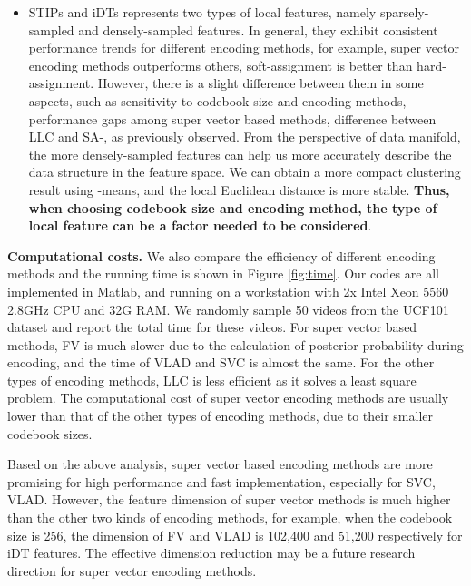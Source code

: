 \documentclass[twocolumn]{svjour3}          \smartqed  \usepackage{slashbox}
\begin{document}
\begin{itemize}
  \item STIPs and iDTs represents two types of local features, namely sparsely-sampled and densely-sampled features. In general, they exhibit consistent performance trends for different encoding methods, for example, super vector encoding methods outperforms others, soft-assignment is better than hard-assignment. However, there is a slight difference between them in some aspects, such as sensitivity to codebook size and encoding methods, performance gaps among super vector based methods, difference between LLC and SA-, as previously observed. From the perspective of data manifold, the more densely-sampled features can help us more accurately describe the data structure in the feature space. We can obtain a more compact clustering result using -means, and the local Euclidean distance is more stable. \textbf{Thus, when choosing codebook size and encoding method, the type of local feature can be a factor needed to be considered}.
\end{itemize}

\textbf{Computational costs.} We also compare the efficiency of different encoding methods and the running time is shown in Figure \ref{fig:time}. Our codes are all implemented in Matlab, and running on a workstation with 2x Intel Xeon 5560 2.8GHz CPU and 32G RAM. We randomly sample 50 videos from the UCF101 dataset and report the total time for these videos. For super vector based methods, FV is much slower due to the calculation of posterior probability during encoding, and the time of VLAD and SVC is almost the same. For the other types of encoding methods, LLC is less efficient as it solves a least square problem. The computational cost of super vector encoding methods are usually lower than that of the other types of encoding methods, due to their smaller codebook sizes.

Based on the above analysis, super vector based encoding methods are more promising for high performance and fast implementation, especially for SVC, VLAD. However, the feature dimension of super vector methods is much higher than the other two kinds of encoding methods, for example, when the codebook size is 256, the dimension of FV and VLAD is 102,400 and 51,200 respectively for iDT features. The effective dimension reduction may be a future research direction for super vector encoding methods.
\end{document}
